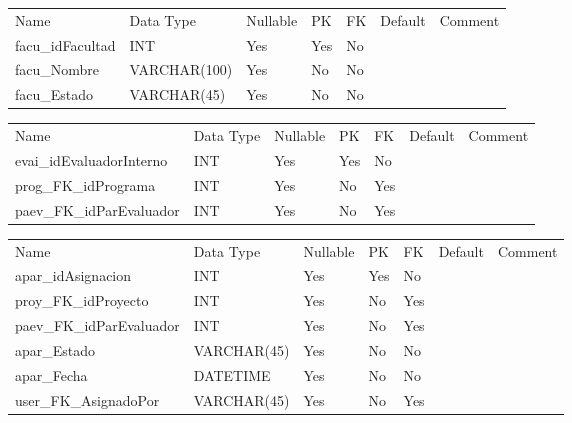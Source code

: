 			\begin{center}
				\begin{tabular}{ |l|l|l|l|l|l|l| }
					\hline
					Name & Data Type & Nullable & PK & FK & Default & Comment \\
					facu_idFacultad & INT & Yes & Yes & No &  & \\ \hline 
facu_Nombre & VARCHAR(100) & Yes & No & No &  & \\ \hline 
facu_Estado & VARCHAR(45) & Yes & No & No &  & \\ \hline 

				\end{tabular}
			\end{center}
		

			\begin{center}
				\begin{tabular}{ |l|l|l|l|l|l|l| }
					\hline
					Name & Data Type & Nullable & PK & FK & Default & Comment \\
					evai_idEvaluadorInterno & INT & Yes & Yes & No &  & \\ \hline 
prog_FK_idPrograma & INT & Yes & No & Yes &  & \\ \hline 
paev_FK_idParEvaluador & INT & Yes & No & Yes &  & \\ \hline 

				\end{tabular}
			\end{center}
		

			\begin{center}
				\begin{tabular}{ |l|l|l|l|l|l|l| }
					\hline
					Name & Data Type & Nullable & PK & FK & Default & Comment \\
					apar_idAsignacion & INT & Yes & Yes & No &  & \\ \hline 
proy_FK_idProyecto & INT & Yes & No & Yes &  & \\ \hline 
paev_FK_idParEvaluador & INT & Yes & No & Yes &  & \\ \hline 
apar_Estado & VARCHAR(45) & Yes & No & No &  & \\ \hline 
apar_Fecha & DATETIME & Yes & No & No &  & \\ \hline 
user_FK_AsignadoPor & VARCHAR(45) & Yes & No & Yes &  & \\ \hline 

				\end{tabular}
			\end{center}
		

